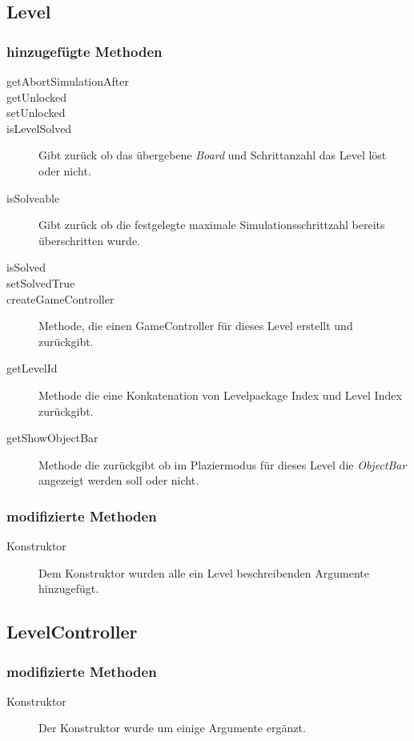 \subsection{Level}

	\subsubsection{hinzugefügte Methoden}
		\begin{description}
			\item[getAbortSimulationAfter]
			\item[getUnlocked]
			\item[setUnlocked]
			\item[isLevelSolved] Gibt zurück ob das übergebene \emph{Board} und Schrittanzahl 
				das Level löst oder nicht.
			\item[isSolveable] Gibt zurück ob die festgelegte maximale Simulationsschrittzahl bereits 
				überschritten wurde.
			\item[isSolved]
			\item[setSolvedTrue]
			\item[createGameController] Methode, die einen GameController für dieses Level erstellt und zurückgibt.
			\item[getLevelId] Methode die eine Konkatenation von Levelpackage Index und Level Index zurückgibt.
			\item[getShowObjectBar] Methode die zurückgibt ob im Plaziermodus für dieses Level die \emph{ObjectBar} 
				angezeigt werden soll oder nicht.
		\end{description}
	\subsubsection{modifizierte Methoden}
		\begin{description}
			\item[Konstruktor] Dem Konstruktor wurden alle ein Level beschreibenden Argumente hinzugefügt.
		\end{description}

\subsection{LevelController}

	\subsubsection{modifizierte Methoden}
		\begin{description}
			\item[Konstruktor] Der Konstruktor wurde um einige Argumente ergänzt.
		\end{description}
